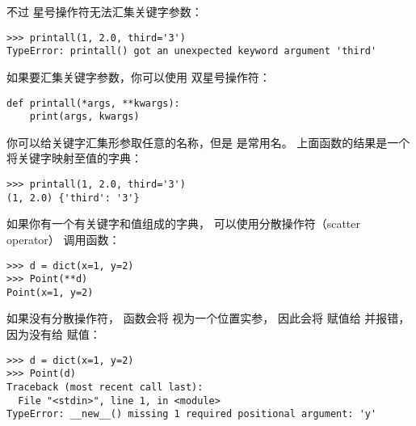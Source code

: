 
不过 \li{*} 星号操作符无法汇集关键字参数：

\begin{lstlisting}
>>> printall(1, 2.0, third='3')
TypeError: printall() got an unexpected keyword argument 'third'
\end{lstlisting}


如果要汇集关键字参数，你可以使用 \li{**} 双星号操作符：

\begin{lstlisting}
def printall(*args, **kwargs):
    print(args, kwargs)
\end{lstlisting}


你可以给关键字汇集形参取任意的名称，但是  是常用名。  
上面函数的结果是一个将关键字映射至值的字典：

\begin{lstlisting}
>>> printall(1, 2.0, third='3')
(1, 2.0) {'third': '3'}
\end{lstlisting}


如果你有一个有关键字和值组成的字典， 可以使用分散操作符（scatter operator） \li{**} 调用函数：

\begin{lstlisting}
>>> d = dict(x=1, y=2)
>>> Point(**d)
Point(x=1, y=2)
\end{lstlisting}


如果没有分散操作符， 函数会将  视为一个位置实参， 因此会将  赋值给  并报错， 因为没有给  赋值：

\begin{lstlisting}
>>> d = dict(x=1, y=2)
>>> Point(d)
Traceback (most recent call last):
  File "<stdin>", line 1, in <module>
TypeError: __new__() missing 1 required positional argument: 'y'
\end{lstlisting}

